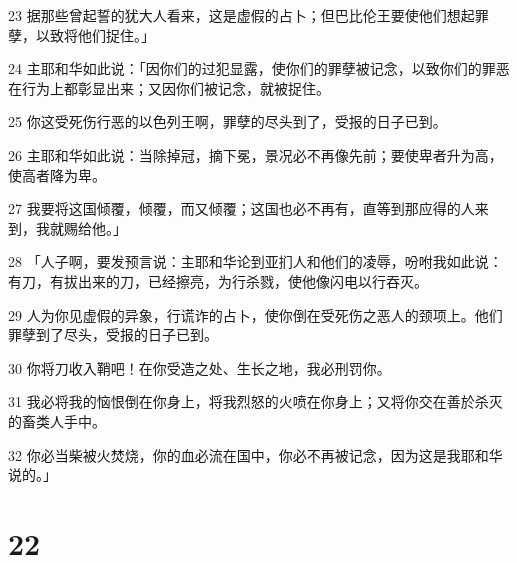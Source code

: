 \par 23 据那些曾起誓的犹大人看来，这是虚假的占卜；但巴比伦王要使他们想起罪孽，以致将他们捉住。」
\par 24 主耶和华如此说：「因你们的过犯显露，使你们的罪孽被记念，以致你们的罪恶在行为上都彰显出来；又因你们被记念，就被捉住。
\par 25 你这受死伤行恶的以色列王啊，罪孽的尽头到了，受报的日子已到。
\par 26 主耶和华如此说：当除掉冠，摘下冕，景况必不再像先前；要使卑者升为高，使高者降为卑。
\par 27 我要将这国倾覆，倾覆，而又倾覆；这国也必不再有，直等到那应得的人来到，我就赐给他。」
\par 28 「人子啊，要发预言说：主耶和华论到亚扪人和他们的凌辱，吩咐我如此说：有刀，有拔出来的刀，已经擦亮，为行杀戮，使他像闪电以行吞灭。
\par 29 人为你见虚假的异象，行谎诈的占卜，使你倒在受死伤之恶人的颈项上。他们罪孽到了尽头，受报的日子已到。
\par 30 你将刀收入鞘吧！在你受造之处、生长之地，我必刑罚你。
\par 31 我必将我的恼恨倒在你身上，将我烈怒的火喷在你身上；又将你交在善於杀灭的畜类人手中。
\par 32 你必当柴被火焚烧，你的血必流在国中，你必不再被记念，因为这是我耶和华说的。」

\chapter{22}

